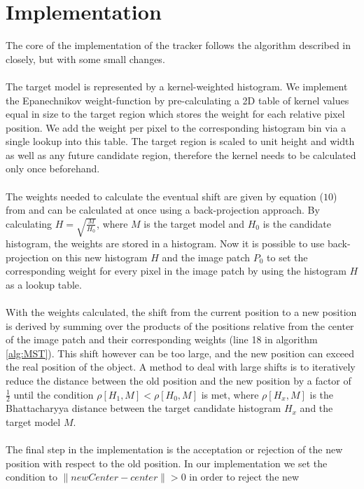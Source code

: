 \documentclass[a4paper,11pt]{article}
\begin{document}
	\section{Implementation}
		The core of the implementation of the tracker follows the algorithm described
		in \cite{KBOT} closely, but with some small changes.
		\\ \\
		The target model is represented by a kernel-weighted histogram. We implement the
		Epanechnikov weight-function by pre-calculating a 2D table of kernel values equal
		in size to the target region which stores the weight for each relative pixel
		position. We add the weight per pixel to the corresponding histogram bin via a single
		lookup into this table. The target region is scaled to unit height and width as well
		as any future candidate region, therefore the kernel needs to be calculated only once
		beforehand.
		\\ \\
		The weights needed to calculate the eventual shift are given by equation ($10$)
		from \cite{KBOT} and can be calculated at once using a back-projection approach.
		By calculating $H=\sqrt{\frac{M}{H_0}}$, where $M$ is the target model and $H_0$
		is the candidate histogram, the weights are stored in a histogram. Now it is
		possible to use back-projection on this new histogram $H$ and the image patch
		$P_0$ to set the corresponding weight for every pixel in the image patch by
		using the histogram $H$ as a lookup table.
		\\ \\
		With the weights calculated, the shift from the current position to a new position
		is derived by summing over the products of the positions relative from the center
		of the image patch and their corresponding weights (line 18 in algorithm \ref{alg:MST}).
		This shift however can be too large, and the new position can exceed the real position
		of the object. A method to deal with large shifts is to iteratively reduce the distance
		between the old position and the new position by a factor of $\frac{1}{2}$ until the
		condition $\rho[H_1, M] < \rho[H_0,M]$ is met, where $\rho[H_x, M]$ is the Bhattacharyya
		distance between the target candidate histogram $H_x$ and the target model $M$.
		\\ \\
		The final step in the implementation is the acceptation or rejection of the new
		position with respect to the old position. In our implementation we set the condition
		to $\parallel newCenter - center \parallel > 0$ in order to reject the new
\end{document}
